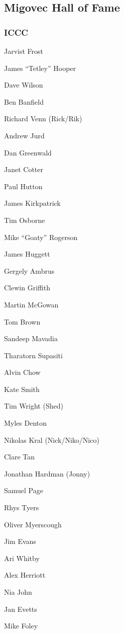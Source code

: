 \begin{tcolorbox}
\begin{fullwidth} 

\chapter{Migovec Hall of Fame}


 \begin{multicols}{2} 
\subsection{ICCC}

Jarvist Frost

James “Tetley” Hooper

Dave Wilson

Ben Banfield

Richard Venn (Rick/Rik)

Andrew Jurd

Dan Greenwald

Janet Cotter

Paul Hutton

James Kirkpatrick

Tim Osborne

Mike “Goaty” Rogerson

James Huggett

Gergely Ambrus

Clewin Griffith

Martin McGowan

Tom Brown

Sandeep Mavadia

Tharatorn Supasiti

Alvin Chow

Kate Smith

Tim Wright (Shed)

Myles Denton

Nikolas Kral (Nick/Niko/Nico)

Clare Tan

Jonathan Hardman (Jonny)

Samuel Page

Rhys Tyers

Oliver Myerscough

Jim Evans

Ari Whitby

Alex Herriott

Nia John

Jan Evetts

Mike Foley


\end{multicols}
\end{fullwidth}
\end{tcolorbox}
